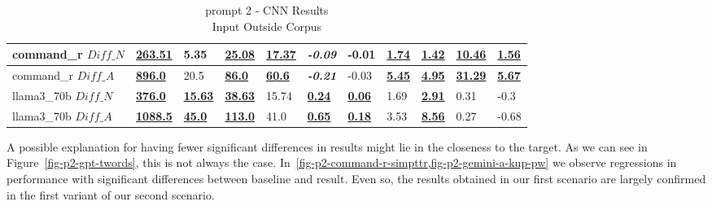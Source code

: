 \documentclass[11pt]{article}
\begin{document}
\begin{table}[hpb]
{\begin{tabular}{lllllllllll}
            command\_r $Diff\_N$  & \textbf{\underline{263.51}}  & 5.35                       & \textbf{\underline{25.08}}  & \textbf{\underline{17.37}} & \textbf{\textit{-0.09}}   & -0.01                     & \textbf{\underline{1.74}} & \textbf{\underline{1.42}} & \textbf{\underline{10.46}} & \textbf{\underline{1.56}} \\ \midrule
            command\_r $Diff\_A$  & \textbf{\underline{896.0}}   & 20.5                       & \textbf{\underline{86.0}}   & \textbf{\underline{60.6}}  & \textbf{\textit{-0.21}}   & -0.03                     & \textbf{\underline{5.45}} & \textbf{\underline{4.95}} & \textbf{\underline{31.29}} & \textbf{\underline{5.67}} \\ \midrule
            llama3\_70b $Diff\_N$ & \textbf{\underline{376.0}}   & \textbf{\underline{15.63}} & \textbf{\underline{38.63}}  & 15.74                      & \textbf{\underline{0.24}} & \textbf{\underline{0.06}} & 1.69                      & \textbf{\underline{2.91}} & 0.31                       & -0.3                      \\ \midrule
            llama3\_70b $Diff\_A$ & \textbf{\underline{1088.5}}  & \textbf{\underline{45.0}}  & \textbf{\underline{113.0}}  & 41.0                       & \textbf{\underline{0.65}} & \textbf{\underline{0.18}} & 3.53                      & \textbf{\underline{8.56}} & 0.27                       & -0.68                     \\ \bottomrule
        \end{tabular}%
    }
    \caption{prompt 2 - CNN Results\\Input Outside Corpus}\label{table-prompt-2-cnn-dailymail} %
\end{table}

A possible explanation for having fewer significant differences in results might
lie in the closeness to the target.
As we can see in Figure~\ref{fig-p2-gpt-twords}, this is not always the case.
In~\cref{fig-p2-command-r-simpttr,fig-p2-gemini-a-kup-pw} we observe regressions
in performance with significant differences between baseline and result.
Even so, the results obtained in our first scenario are largely confirmed in the
first variant of our second scenario.
\end{document}
